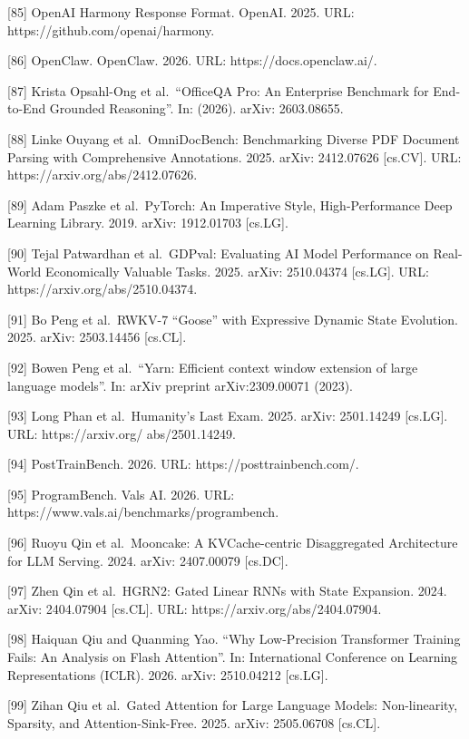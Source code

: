 {[}85{]} OpenAI Harmony Response Format. OpenAI. 2025. URL:
https://github.com/openai/harmony.

{[}86{]} OpenClaw. OpenClaw. 2026. URL: https://docs.openclaw.ai/.

{[}87{]} Krista Opsahl-Ong et al.~``OfficeQA Pro: An Enterprise
Benchmark for End-to-End Grounded Reasoning''. In: (2026). arXiv:
2603.08655.

{[}88{]} Linke Ouyang et al.~OmniDocBench: Benchmarking Diverse PDF
Document Parsing with Comprehensive Annotations. 2025. arXiv: 2412.07626
{[}cs.CV{]}. URL: https://arxiv.org/abs/2412.07626.

{[}89{]} Adam Paszke et al.~PyTorch: An Imperative Style,
High-Performance Deep Learning Library. 2019. arXiv: 1912.01703
{[}cs.LG{]}.

{[}90{]} Tejal Patwardhan et al.~GDPval: Evaluating AI Model Performance
on Real-World Economically Valuable Tasks. 2025. arXiv: 2510.04374
{[}cs.LG{]}. URL: https://arxiv.org/abs/2510.04374.

{[}91{]} Bo Peng et al.~RWKV-7 ``Goose'' with Expressive Dynamic State
Evolution. 2025. arXiv: 2503.14456 {[}cs.CL{]}.

{[}92{]} Bowen Peng et al.~``Yarn: Efficient context window extension of
large language models''. In: arXiv preprint arXiv:2309.00071 (2023).

{[}93{]} Long Phan et al.~Humanity's Last Exam. 2025. arXiv: 2501.14249
{[}cs.LG{]}. URL: https://arxiv.org/ abs/2501.14249.

{[}94{]} PostTrainBench. 2026. URL: https://posttrainbench.com/.

{[}95{]} ProgramBench. Vals AI. 2026. URL:
https://www.vals.ai/benchmarks/programbench.

{[}96{]} Ruoyu Qin et al.~Mooncake: A KVCache-centric Disaggregated
Architecture for LLM Serving. 2024. arXiv: 2407.00079 {[}cs.DC{]}.

{[}97{]} Zhen Qin et al.~HGRN2: Gated Linear RNNs with State Expansion.
2024. arXiv: 2404.07904 {[}cs.CL{]}. URL:
https://arxiv.org/abs/2404.07904.

{[}98{]} Haiquan Qiu and Quanming Yao. ``Why Low-Precision Transformer
Training Fails: An Analysis on Flash Attention''. In: International
Conference on Learning Representations (ICLR). 2026. arXiv: 2510.04212
{[}cs.LG{]}.

{[}99{]} Zihan Qiu et al.~Gated Attention for Large Language Models:
Non-linearity, Sparsity, and Attention-Sink-Free. 2025. arXiv:
2505.06708 {[}cs.CL{]}.

